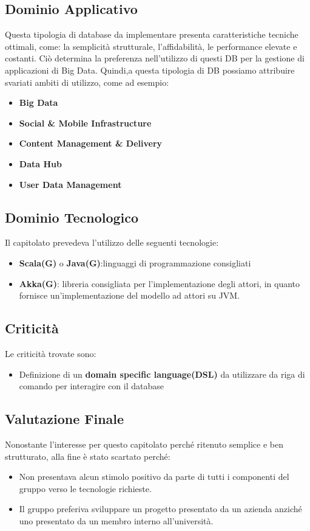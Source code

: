 \subsection{Dominio Applicativo}
Questa tipologia di database da implementare presenta caratteristiche tecniche ottimali, come: la semplicità strutturale, l'affidabilità, le performance elevate e costanti.
Ciò determina la preferenza nell'utilizzo di questi DB per la gestione di applicazioni di Big Data.
Quindi,a questa tipologia di DB possiamo attribuire svariati ambiti di utilizzo, come ad esempio:
\begin{itemize}
\item
\textbf{Big Data} 
\item
\textbf{Social & Mobile Infrastructure}
\item
\textbf{Content Management & Delivery}
\item
\textbf{Data Hub}
\item
\textbf{User Data Management} 
\end{itemize}

\subsection{Dominio Tecnologico}
Il capitolato prevedeva l'utilizzo delle seguenti tecnologie: 
\begin{itemize}
\item
\textbf{Scala(G)} o \textbf{Java(G)}:linguaggi di programmazione consigliati
\item
\textbf{Akka(G)}: libreria consigliata per l'implementazione degli attori, in quanto fornisce un'implementazione del modello ad attori su JVM.
\end{itemize}

\subsection{Criticità}
Le criticità trovate sono:
\begin{itemize}
\item
Definizione di un \textbf{domain specific language(DSL)} da utilizzare da riga di comando per interagire con il database
\end{itemize}

\subsection{Valutazione Finale}
Nonostante l'interesse per questo capitolato perché ritenuto semplice e ben strutturato, alla fine è stato scartato perché:
\begin{itemize}
\item
Non presentava alcun stimolo positivo da parte di tutti i componenti del gruppo verso le tecnologie richieste.
\item
Il gruppo preferiva sviluppare un progetto presentato da un azienda anziché uno presentato da un membro interno all'università.
\end{itemize}